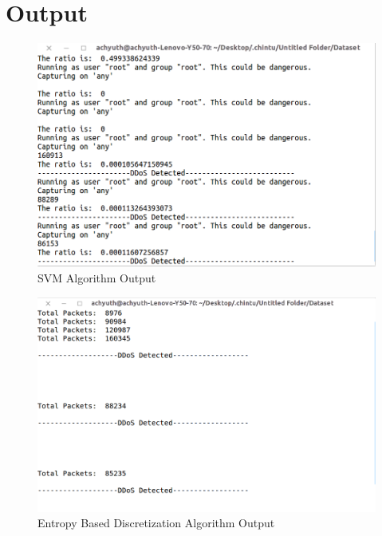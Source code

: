 \documentclass[12pt,a4paper,final]{report}
\begin{document}
\newpage

\section{Output}

\begin{figure}[h]
\centering
\includegraphics[scale=0.4]{SVMOutput.png}
\caption{SVM Algorithm Output}
\end{figure}


\begin{figure}
\centering
\includegraphics[scale=0.4]{EBDOutput.png}
\caption{Entropy Based Discretization Algorithm Output}
\end{figure}
\end{document}
